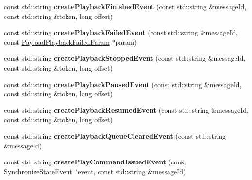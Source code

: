 \begin{DoxyCompactItemize}
\item 
\mbox{\label{classAVSJson_1_1JsonFactory_a1dd6693e5aedaa6f861e940199cd7253}} 
const std\+::string {\bfseries create\+Playback\+Finished\+Event} (const std\+::string \&message\+Id, const std\+::string \&token, long offset)
\item 
\mbox{\label{classAVSJson_1_1JsonFactory_ad0bf175be488881f5c212348df49102d}} 
const std\+::string {\bfseries create\+Playback\+Failed\+Event} (const std\+::string \&message\+Id, const \hyperlink{structAVSJson_1_1PayloadPlaybackFailedParam}{Payload\+Playback\+Failed\+Param} $\ast$param)
\item 
\mbox{\label{classAVSJson_1_1JsonFactory_a47d87687e09ec597f6d59453aa5db33d}} 
const std\+::string {\bfseries create\+Playback\+Stopped\+Event} (const std\+::string \&message\+Id, const std\+::string \&token, long offset)
\item 
\mbox{\label{classAVSJson_1_1JsonFactory_abbb51408dd99f7d422d5bc1fc6bae8df}} 
const std\+::string {\bfseries create\+Playback\+Paused\+Event} (const std\+::string \&message\+Id, const std\+::string \&token, long offset)
\item 
\mbox{\label{classAVSJson_1_1JsonFactory_a081dec302444567e76a78dba3e8a6a8a}} 
const std\+::string {\bfseries create\+Playback\+Resumed\+Event} (const std\+::string \&message\+Id, const std\+::string \&token, long offset)
\item 
\mbox{\label{classAVSJson_1_1JsonFactory_a016050b46ab274d271917efb1377c509}} 
const std\+::string {\bfseries create\+Playback\+Queue\+Cleared\+Event} (const std\+::string \&message\+Id)
\item 
\mbox{\label{classAVSJson_1_1JsonFactory_a90f1f7963109b1f311bd6b77ea3152b2}} 
const std\+::string {\bfseries create\+Play\+Command\+Issued\+Event} (const \hyperlink{structAVSJson_1_1SynchronizeStateEvent}{Synchronize\+State\+Event} $\ast$event, const std\+::string \&message\+Id)
\item 
\mbox{\label{classAVSJson_1_1JsonFactory_a63aef66441b23a9a16c4302dc6bffa01}} 

\end{DoxyCompactItemize}

